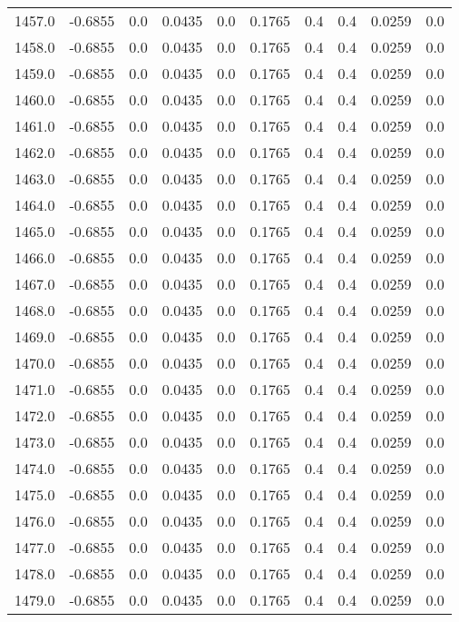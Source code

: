 \begin{longtable}{lrrrrrrrrr}
1457.0 & -0.6855 & 0.0 & 0.0435 & 0.0 & 0.1765 & 0.4 & 0.4 & 0.0259 & 0.0 \\
1458.0 & -0.6855 & 0.0 & 0.0435 & 0.0 & 0.1765 & 0.4 & 0.4 & 0.0259 & 0.0 \\
1459.0 & -0.6855 & 0.0 & 0.0435 & 0.0 & 0.1765 & 0.4 & 0.4 & 0.0259 & 0.0 \\
1460.0 & -0.6855 & 0.0 & 0.0435 & 0.0 & 0.1765 & 0.4 & 0.4 & 0.0259 & 0.0 \\
1461.0 & -0.6855 & 0.0 & 0.0435 & 0.0 & 0.1765 & 0.4 & 0.4 & 0.0259 & 0.0 \\
1462.0 & -0.6855 & 0.0 & 0.0435 & 0.0 & 0.1765 & 0.4 & 0.4 & 0.0259 & 0.0 \\
1463.0 & -0.6855 & 0.0 & 0.0435 & 0.0 & 0.1765 & 0.4 & 0.4 & 0.0259 & 0.0 \\
1464.0 & -0.6855 & 0.0 & 0.0435 & 0.0 & 0.1765 & 0.4 & 0.4 & 0.0259 & 0.0 \\
1465.0 & -0.6855 & 0.0 & 0.0435 & 0.0 & 0.1765 & 0.4 & 0.4 & 0.0259 & 0.0 \\
1466.0 & -0.6855 & 0.0 & 0.0435 & 0.0 & 0.1765 & 0.4 & 0.4 & 0.0259 & 0.0 \\
1467.0 & -0.6855 & 0.0 & 0.0435 & 0.0 & 0.1765 & 0.4 & 0.4 & 0.0259 & 0.0 \\
1468.0 & -0.6855 & 0.0 & 0.0435 & 0.0 & 0.1765 & 0.4 & 0.4 & 0.0259 & 0.0 \\
1469.0 & -0.6855 & 0.0 & 0.0435 & 0.0 & 0.1765 & 0.4 & 0.4 & 0.0259 & 0.0 \\
1470.0 & -0.6855 & 0.0 & 0.0435 & 0.0 & 0.1765 & 0.4 & 0.4 & 0.0259 & 0.0 \\
1471.0 & -0.6855 & 0.0 & 0.0435 & 0.0 & 0.1765 & 0.4 & 0.4 & 0.0259 & 0.0 \\
1472.0 & -0.6855 & 0.0 & 0.0435 & 0.0 & 0.1765 & 0.4 & 0.4 & 0.0259 & 0.0 \\
1473.0 & -0.6855 & 0.0 & 0.0435 & 0.0 & 0.1765 & 0.4 & 0.4 & 0.0259 & 0.0 \\
1474.0 & -0.6855 & 0.0 & 0.0435 & 0.0 & 0.1765 & 0.4 & 0.4 & 0.0259 & 0.0 \\
1475.0 & -0.6855 & 0.0 & 0.0435 & 0.0 & 0.1765 & 0.4 & 0.4 & 0.0259 & 0.0 \\
1476.0 & -0.6855 & 0.0 & 0.0435 & 0.0 & 0.1765 & 0.4 & 0.4 & 0.0259 & 0.0 \\
1477.0 & -0.6855 & 0.0 & 0.0435 & 0.0 & 0.1765 & 0.4 & 0.4 & 0.0259 & 0.0 \\
1478.0 & -0.6855 & 0.0 & 0.0435 & 0.0 & 0.1765 & 0.4 & 0.4 & 0.0259 & 0.0 \\
1479.0 & -0.6855 & 0.0 & 0.0435 & 0.0 & 0.1765 & 0.4 & 0.4 & 0.0259 & 0.0 \\

\end{longtable}
